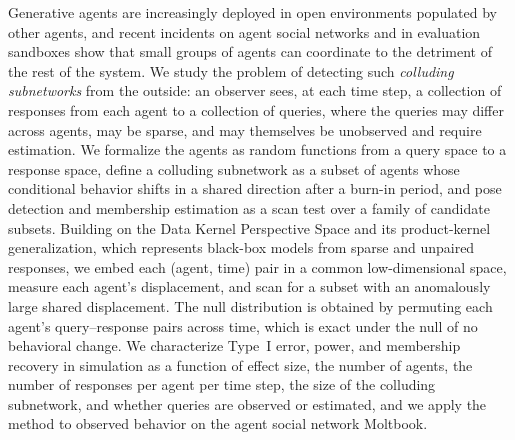 Generative agents are increasingly deployed in open environments populated by other agents, and recent incidents on agent social networks and in evaluation sandboxes show that small groups of agents can coordinate to the detriment of the rest of the system. We study the problem of detecting such \emph{colluding subnetworks} from the outside: an observer sees, at each time step, a collection of responses from each agent to a collection of queries, where the queries may differ across agents, may be sparse, and may themselves be unobserved and require estimation. We formalize the agents as random functions from a query space to a response space, define a colluding subnetwork as a subset of agents whose conditional behavior shifts in a shared direction after a burn-in period, and pose detection and membership estimation as a scan test over a family of candidate subsets. Building on the Data Kernel Perspective Space and its product-kernel generalization, which represents black-box models from sparse and unpaired responses, we embed each (agent, time) pair in a common low-dimensional space, measure each agent's displacement, and scan for a subset with an anomalously large shared displacement. The null distribution is obtained by permuting each agent's query--response pairs across time, which is exact under the null of no behavioral change. We characterize Type~I error, power, and membership recovery in simulation as a function of effect size, the number of agents, the number of responses per agent per time step, the size of the colluding subnetwork, and whether queries are observed or estimated, and we apply the method to observed behavior on the agent social network Moltbook.
